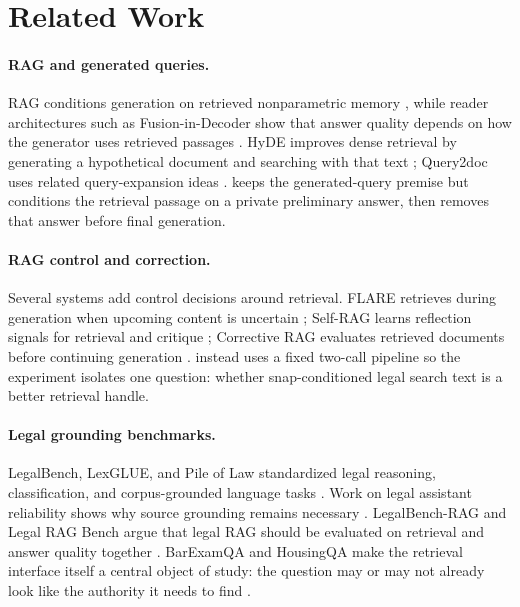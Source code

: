 \section{Related Work}\label{sec:related_work}

\paragraph{RAG and generated queries.}
RAG conditions generation on retrieved nonparametric memory
\citep{lewis2020rag}, while reader architectures such as Fusion-in-Decoder
show that answer quality depends on how the generator uses retrieved passages
\citep{izacard2021fid}. HyDE improves dense retrieval by generating a
hypothetical document and searching with that text \citep{gao2023hyde};
Query2doc uses related query-expansion ideas \citep{wang2023query2doc}. \hyre{}
keeps the generated-query premise but conditions the retrieval passage on a
private preliminary answer, then removes that answer before final generation.

\paragraph{RAG control and correction.}
Several systems add control decisions around retrieval. FLARE retrieves during
generation when upcoming content is uncertain \citep{jiang2023flare};
Self-RAG learns reflection signals for retrieval and critique
\citep{asai2024selfrag}; Corrective RAG evaluates retrieved documents before
continuing generation \citep{yan2024crag}. \hyre{} instead uses a fixed
two-call pipeline so the experiment isolates one question: whether
snap-conditioned legal search text is a better retrieval handle.

\paragraph{Legal grounding benchmarks.}
LegalBench, LexGLUE, and Pile of Law standardized legal reasoning,
classification, and corpus-grounded language tasks
\citep{guha2023legalbench,chalkidis2022lexglue,henderson2022pileoflaw}.
Work on legal assistant reliability shows why source grounding remains
necessary \citep{magesh2024hallucinations}. LegalBench-RAG and Legal RAG Bench
argue that legal RAG should be evaluated on retrieval and answer quality
together \citep{pipitone2024legalbenchrag,butler2026legalragbench}. BarExamQA
and HousingQA make the retrieval interface itself a central object of study:
the question may or may not already look like the authority it needs to find
\citep{Zheng_2025}.
